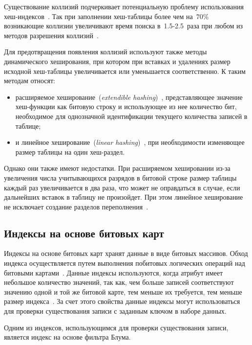 Существование коллизий подчеркивает потенциальную проблему использования
хеш-индексов~\cite{squares}. Так при заполнении хеш-таблицы более чем на~$70\%$
возникающие коллизии увеличивают время поиска в~1.5-2.5~раза при любом из
методов разрешения коллизий~\cite{baw}.

Для предотвращения появления коллизий используют также методы динамического
хеширования, при котором при вставках и удалениях размер исходной хеш-таблицы
увеличивается или уменьшается соответственно. К таким методам относят:
\begin{itemize}
    \item расширяемое хеширование~(\textit{extendible hashing})~\cite{encycl},
        представляющее значение хеш-функции как битовую строку и использующее из
        нее количество бит, необходимое для однозначной идентификации текущего
        количества записей в таблице;
    \item и линейное хеширование~(\textit{linear hashing})~\cite{encycl}, при
        необходимости изменяющее размер таблицы на один хеш-раздел.
\end{itemize}

Однако они также имеют недостатки. При расширяемом хешировании из-за увеличения
числа учитывающихся разрядов в битовой строке размер таблицы каждый раз
увеличивается в два раза, что может не оправдаться в случае, если дальнейших
вставок в таблицу не произойдет. При этом линейное хеширование не исключает
создание разделов переполнения~\cite{encycl}.


\subsection{Индексы на основе битовых карт}

Индексы на основе битовых карт хранят данные в виде битовых массивов. Обход
индекса осуществляется путем выполнения побитовых логических операций над
битовыми картами~\cite{loshad}. Данные индексы используются, когда атрибут
имеет небольшое количество значений, так как, чем больше записей соответствуют
значению одной и той же битовой карте, тем меньше их требуется, тем меньше
размер индекса~\cite{marvel}. За счет этого свойства данные индексы могут
использоваться для проверки существования записи с заданным ключом в наборе
данных.

Одним из индексов, использующимся для проверки существования записи, является
индекс на основе фильтра Блума.

